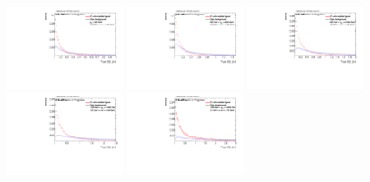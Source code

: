 \begin{figure}
\bigskip
\includegraphics[width=0.3\textwidth]{sascha_input/Appendix/Distributions/higgs/distributions/beta3/h_normal_tj_D2_3_bin1.pdf} \hspace{1mm}
\includegraphics[width=0.3\textwidth]{sascha_input/Appendix/Distributions/higgs/distributions/beta3/h_normal_tj_D2_3_bin2.pdf} \hspace{4mm}
\includegraphics[width=0.3\textwidth]{sascha_input/Appendix/Distributions/higgs/distributions/beta3/h_normal_tj_D2_3_bin3.pdf} 
\bigskip
\includegraphics[width=0.3\textwidth]{sascha_input/Appendix/Distributions/higgs/distributions/beta3/h_normal_tj_D2_3_bin4.pdf} \hspace{4mm}
\includegraphics[width=0.3\textwidth]{sascha_input/Appendix/Distributions/higgs/distributions/beta3/h_normal_tj_D2_3_bin5.pdf} 


\end{figure}
